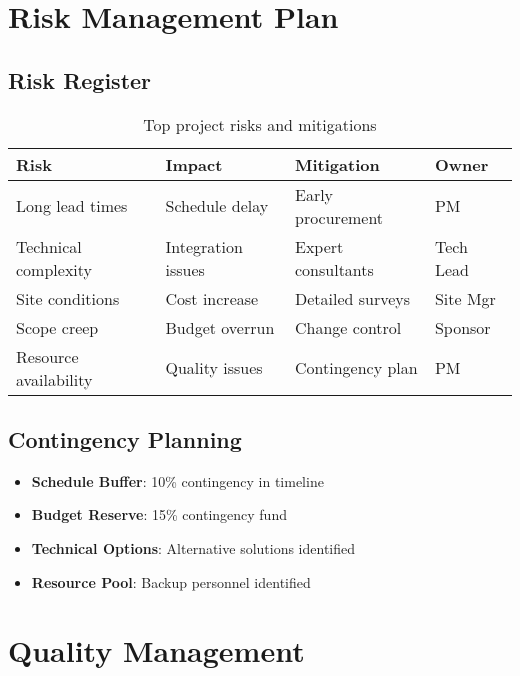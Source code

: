 \section{Risk Management Plan}

\subsection{Risk Register}


\begin{table}[H]
\centering
\begin{tabularx}{\textwidth}{@{}lXXl@{}}
\toprule
\textbf{Risk} & \textbf{Impact} & \textbf{Mitigation} & \textbf{Owner} \\
\midrule
Long lead times & Schedule delay & Early procurement & PM \\
Technical complexity & Integration issues & Expert consultants & Tech Lead \\
Site conditions & Cost increase & Detailed surveys & Site Mgr \\
Scope creep & Budget overrun & Change control & Sponsor \\
Resource availability & Quality issues & Contingency plan & PM \\
\bottomrule
\end{tabularx}
\caption{Top project risks and mitigations}
\end{table}

\subsection{Contingency Planning}

\begin{itemize}
    \item \textbf{Schedule Buffer}: 10\% contingency in timeline
    \item \textbf{Budget Reserve}: 15\% contingency fund
    \item \textbf{Technical Options}: Alternative solutions identified
    \item \textbf{Resource Pool}: Backup personnel identified
\end{itemize}

\section{Quality Management}

